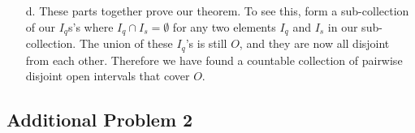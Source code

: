 \documentclass[12pt]{article}
\begin{document}
\begin{itemize}
\begin{proof}
        For the second part, take $q, s \in \mathbb{Q} \cap O$. Then if $I_q \cap I_s \neq \emptyset$, there exists $x \in I_q \cap I_s$. Thus both $\alpha(q) < x < \beta(q)$ and $\alpha(s) < x < \beta(s)$. But then by the definition of $\alpha$ and $\beta$, we know that $\alpha(q) = \alpha(s)$ and $\beta(q) = \beta(s)$. Therefore $I_q = I_s$. This completes the proof of the second part of the claim.
    \end{proof}

    \item[d.] These parts together prove our theorem. To see this, form a sub-collection of our $I_q$s's where $I_q \cap I_s = \emptyset$ for any two elements $I_q$ and $I_s$ in our sub-collection. The union of these $I_q$'s is still $O$, and they are now all disjoint from each other. Therefore we have found a countable collection of pairwise disjoint open intervals that cover $O$.
\end{itemize}

\subsection*{Additional Problem 2}
\end{document}
